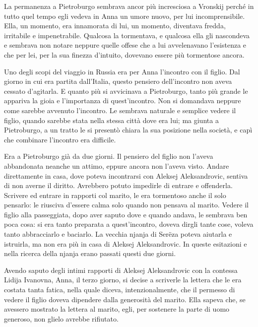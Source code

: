 La permanenza a Pietroburgo sembrava ancor più incresciosa a Vronskij perché in tutto quel tempo egli vedeva in Anna un umore nuovo, per lui incomprensibile. Ella, un momento, era innamorata di lui, un momento, diventava fredda, irritabile e impenetrabile. Qualcosa la tormentava, e qualcosa ella gli nascondeva e sembrava non notare neppure quelle offese che a lui avvelenavano l'esistenza e che per lei, per la sua finezza d'intuito, dovevano essere più tormentose ancora. 

\label{xxix-3} 

Uno degli scopi del viaggio in Russia era per Anna l'incontro con il figlio. Dal giorno in cui era partita dall'Italia, questo pensiero dell'incontro non aveva cessato d'agitarla. E quanto più si avvicinava a Pietroburgo, tanto più grande le appariva la gioia e l'importanza di quest'incontro. Non si domandava neppure come sarebbe avvenuto l'incontro. Le sembrava naturale e semplice vedere il figlio, quando sarebbe stata nella stessa città dove era lui; ma giunta a Pietroburgo, a un tratto le si presentò chiara la sua posizione nella società, e capì che combinare l'incontro era difficile. 

Era a Pietroburgo già da due giorni. Il pensiero del figlio non l'aveva abbandonata neanche un attimo, eppure ancora non l'aveva visto. Andare direttamente in casa, dove poteva incontrarsi con Aleksej Aleksandrovic, sentiva di non averne il diritto. Avrebbero potuto impedirle di entrare e offenderla. Scrivere ed entrare in rapporti col marito, le era tormentoso anche il solo pensarlo: le riusciva d'essere calma solo quando non pensava al marito. Vedere il figlio alla passeggiata, dopo aver saputo dove e quando andava, le sembrava ben poca cosa: si era tanto preparata a quest'incontro, doveva dirgli tante cose, voleva tanto abbracciarlo e baciarlo. La vecchia njanja di Serëza poteva aiutarla e istruirla, ma non era più in casa di Aleksej Aleksandrovic. In queste esitazioni e nella ricerca della njanja erano passati questi due giorni. 

Avendo saputo degli intimi rapporti di Aleksej Aleksandrovic con la contessa Lidija Ivanovna, Anna, il terzo giorno, si decise a scriverle la lettera che le era costata tanta fatica, nella quale diceva, intenzionalmente, che il permesso di vedere il figlio doveva dipendere dalla generosità del marito. Ella sapeva che, se avessero mostrato la lettera al marito, egli, per sostenere la parte di uomo generoso, non glielo avrebbe rifiutato. 


